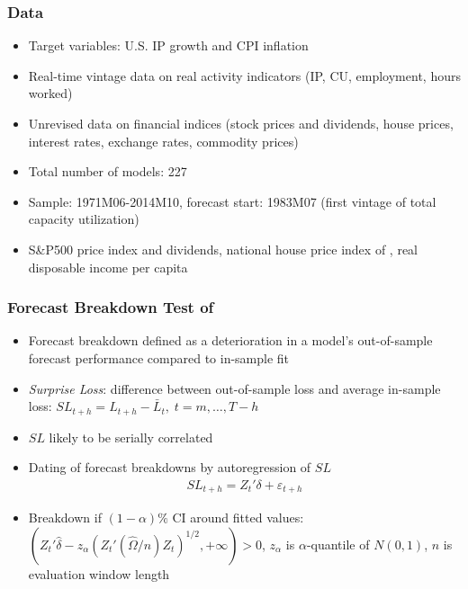 \documentclass [handout] {beamer} %
\begin{document}
\begin{frame}
\frametitle{Data}
	\begin{itemize}
		\item Target variables: U.S. IP growth and CPI inflation
		\item Real-time vintage data on real activity indicators (IP, CU, employment, hours worked)
		\item Unrevised data on financial indices (stock prices and dividends, house prices, interest rates, exchange rates, commodity prices)
		\item Total number of models: 227
		\item Sample: 1971M06-2014M10, forecast start: 1983M07 (first vintage of total capacity utilization)
		\item S\&P500 price index and dividends, national house price index of \cite{shiller05}, real disposable income per capita
	\end{itemize}
\end{frame}

\begin{frame}
\frametitle{Forecast Breakdown Test of \cite{gr09}}
\begin{itemize}
	\item Forecast breakdown defined as a deterioration in a model's out-of-sample forecast performance compared to in-sample fit
	\item \emph{Surprise Loss}: difference between out-of-sample loss and average in-sample loss: $SL_{t+h} = L_{t+h}-\bar{L}_t, \; t=m,\dots,T-h$
	\item $SL$ likely to be serially correlated
	\item Dating of forecast breakdowns by autoregression of $SL$
	\begin{align*}
	SL_{t+h}=Z_t'\delta+\varepsilon_{t+h}
	\end{align*}
	\item Breakdown if $(1-\alpha)\%$ CI around fitted values: $(Z_t'\hat{\delta}-z_\alpha(Z_t'(\hat{\Omega}/n)Z_t)^{1/2},+\infty)>0$, $z_\alpha$ is $\alpha$-quantile of $N(0,1)$, $n$ is evaluation window length
\end{itemize}
\end{frame}
\end{document}

